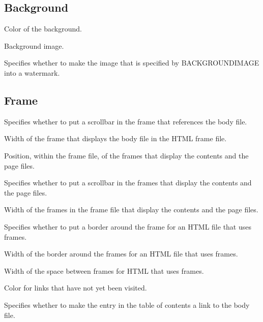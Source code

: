 \subsection{Background}

\begin{description}

Color of the background.

Background image.

Specifies whether to make the image that is specified by BACKGROUNDIMAGE into a watermark.



\end{description}

\subsection{Frame}

\begin{description}

Specifies whether to put a scrollbar in the frame that references the body file.

Width of the frame that displays the body file in the HTML frame file.

Position, within the frame file, of the frames that display the contents and the page files.

Specifies whether to put a scrollbar in the frames that display the contents and the page files.

Width of the frames in the frame file that display the contents and the page files.

Specifies whether to put a border around the frame for an HTML file that uses frames.

Width of the border around the frames for an HTML file that uses frames.

Width of the space between frames for HTML that uses frames.

Color for links that have not yet been visited.

Specifies whether to make the entry in the table of contents a link to the body file.

\end{description}

